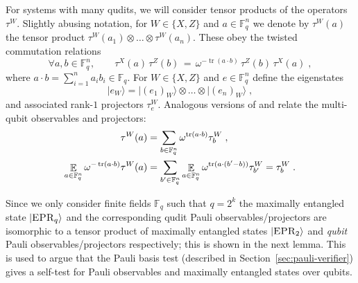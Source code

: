 \documentclass[11pt]{article}
\theoremstyle{definition}
\newcommand{\ket}[1]{|#1\rangle}
\newcommand{\qp}{\tau}
\newcommand{\F}{\ensuremath{\mathbb{F}}}
\newcommand{\ot}{\otimes}
\newcommand{\Fq}{\F_q}
\DeclareMathOperator{\tr}{tr}
\newcommand{\E}{\mathop{\mathbb{E}}\displaylimits}
\newcommand{\labelstyle}[1]{\ensuremath{\textsc{#1}}\xspace}
\newcommand{\EPR}{\labelstyle{EPR}}
\begin{document}
For systems with many qudits, we will consider tensor products of the operators
$\qp^W$.
Slightly abusing notation, for $W \in \{X, Z\}$ and $a \in \Fq^n$ we denote by
$\qp^W(a)$ the tensor product $\qp^W(a_1) \ot \dots \ot \qp^W(a_n)$.
These obey the twisted commutation relations
\begin{equation*}
  \forall a,b\in \Fq^n,\qquad \qp^X(a)\, \qp^Z(b) \,=\, \omega^{-\tr (a \cdot
    b)}\, \qp^Z(b)\, \qp^X(a)\;,
\end{equation*}
where $a \cdot b = \sum_{i=1}^{n} a_i b_i \in \Fq$.
For $W\in\{X,Z\}$ and $e \in \Fq^n$ define the eigenstates
\[ \ket{e_W} = \ket{(e_1)_W} \ot \dots \ot \ket{(e_n)_W}\;, \]
and associated rank-$1$ projectors $\qp^W_e$. Analogous versions of 
and  relate the multi-qubit observables
and projectors:
\begin{align}
  \qp^W(a) &= \sum_{b \in \Fq^n} \omega^{\tr(a \cdot b)}
  \qp^W_b\;, \label{eq:pauli-obs-proj} \\
    \E_{a\in \F_q^n} \omega^{-\tr(a \cdot b)} \qp^W(a) &= \sum_{b'\in \F_q^n} \E_{a\in \F_q^n}
  \omega^{\tr(a\cdot (b'-b))} \qp^W_{b'} = \qp^W_b\;. \label{eq:pauli-inversion-0}
\end{align}

Since we only consider finite fields $\F_q$ such that $q = 2^k$ the maximally
entangled state $\ket{\EPR_q}$ and the corresponding qudit Pauli
observables/projectors are isomorphic to a tensor product of maximally entangled
states $\ket{\EPR_2}$ and \emph{qubit} Pauli observables/projectors
respectively; this is shown in the next lemma.
This is used to argue that the Pauli basis test (described in
Section~\ref{sec:pauli-verifier}) gives a self-test for Pauli observables and
maximally entangled states over qubits.
\end{document}
